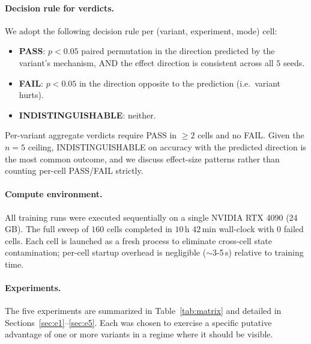 \documentclass{article}
\begin{document}
\paragraph{Decision rule for verdicts.}
We adopt the following decision rule per (variant, experiment, mode) cell:
\begin{itemize}
  \item \textbf{PASS}: $p < 0.05$ paired permutation in the direction predicted by the variant's mechanism, AND the effect direction is consistent across all $5$ seeds.
  \item \textbf{FAIL}: $p < 0.05$ in the direction opposite to the prediction (i.e.\ variant hurts).
  \item \textbf{INDISTINGUISHABLE}: neither.
\end{itemize}
Per-variant aggregate verdicts require PASS in $\geq 2$ cells and no FAIL.
Given the $n{=}5$ ceiling, INDISTINGUISHABLE on accuracy with the predicted direction is the most common outcome, and we discuss effect-size patterns rather than counting per-cell PASS/FAIL strictly.

\paragraph{Compute environment.}
All training runs were executed sequentially on a single NVIDIA RTX 4090 (24\,GB).
The full sweep of $160$ cells completed in $10$\,h $42$\,min wall-clock with $0$ failed cells.
Each cell is launched as a fresh process to eliminate cross-cell state contamination; per-cell startup overhead is negligible ($\sim$3-5\,s) relative to training time.

\paragraph{Experiments.}
The five experiments are summarized in Table~\ref{tab:matrix} and detailed in Sections~\ref{sec:e1}--\ref{sec:e5}.
Each was chosen to exercise a specific putative advantage of one or more variants in a regime where it should be visible.
\end{document}
